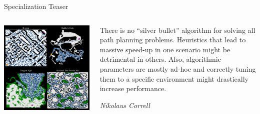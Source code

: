 \documentclass[aspectratio=169]{beamer}
\makeatletter
\newcommand{\red}[1]{{\color{pureminimalistic@text@red} #1}}
\makeatother
\begin{document}
\begin{frame}{Specialization Teaser}
  \begin{columns}[T]
      \begin{column}{.6\linewidth}
      \centering
      \vspace{-1em}
      \includegraphics[height=0.9\textheight]{figures/learned2.pdf}
      \end{column}
      \begin{column}{.4\linewidth}
      \centering
      \epigraph{
      There is no “silver bullet” algorithm for solving all path planning problems. Heuristics that lead to massive speed-up in one scenario might be detrimental in others. Also, algorithmic parameters are mostly ad-hoc and correctly tuning them to a \red{specific environment} might drastically increase performance.
      }{\textit{
      Nikolaus Correll
      }}
      \end{column}
  \end{columns}
\end{frame}
\end{document}
